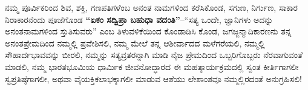 ನಮ್ಮ ಪೂರ್ವಿಕರಿಂದ ಶಿವ, ಶಕ್ತಿ, ಗಣಪತಿಗಳೆಂಬ ಅನಂತ ನಾಮಗಳಿಂದ ಕರೆಸಿಕೊಂಡ, ಸಗುಣ, ನಿರ್ಗುಣ, ಸಾಕಾರ ನಿರಾಕಾರನೆಂದು ಪೂಜೆಗೊಂಡ \textbf{“ಏಕಂ ಸದ್ವಿಪ್ರಾ ಬಹುಧಾ ವದಂತಿ”}–“ಸತ್ಯ ಒಂದೇ, ಜ್ಞಾನಿಗಳು ಅದನ್ನು ಅನಂತನಾಮಗಳಿಂದ ಸ್ತುತಿಸುವರು” ಎಂಬ ತಿಳುವಳಿಕೆಯಿಂದ ಕೊಂಡಾಡಿಸಿ ಕೊಂಡ, ಜಗಜ್ಜನ್ಮಾದಿಕಾರಣನು ತನ್ನ ಅನಂತಪ್ರೇಮದಿಂದ ನಮ್ಮಲ್ಲಿ ಪ್ರವೇಶಿಸಲಿ, ನಮ್ಮ ಮೇಲೆ ತನ್ನ ಆಶೀರ್ವಾದದ ಮಳೆಗರೆಯಲಿ, ನಮ್ಮಲ್ಲಿ ಸೌಹಾರ್ದಭಾವವನ್ನು ಬೀರಲಿ, ನಮ್ಮನ್ನು ಸತ್ಯವ್ರತರನ್ನಾಗಿ ಮಾಡಿ ನೈಜ ಪ್ರೇಮದಿಂದ ಒಬ್ಬರಿಗೊಬ್ಬರು ನೆರವಾಗುವಂತೆ ಮಾಡಲಿ, ನಮ್ಮ ಭಾರತಭೂಮಿಯ ಧಾರ್ಮಿಕ ಜೀವನೋದ್ಧಾರದ ಈ ಮಹತ್ಕಾರ್ಯಕ್ರಮದಲ್ಲಿ ಸ್ವಂತ ಕೀರ್ತಿಗಾಗಲೀ ಸ್ವಪ್ರತಿಷ್ಠೆಗಾಗಲೀ, ಅಥವಾ ವೈಯಕ್ತಿಕಲಾಭಕ್ಕಾಗಲೀ ಮಾಡುವ ಆಶೆಯು ಲೇಶಾಂಶವೂ ನಮ್ಮಲ್ಲಿರದಂತೆ ಅನುಗ್ರಹಿಸಲಿ!

